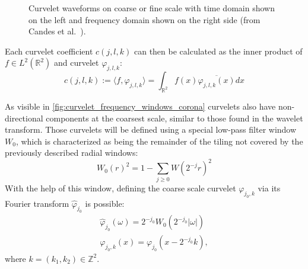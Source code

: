 \begin{figure}[h]
    \centering
    \quad
    \caption[Curvelet waveforms in time and frequency domain]{
        Curvelet waveforms on coarse  or fine
         scale with time domain shown on the
        left and frequency domain shown on the right side (from Candes et al.\
        \autocite{candes_fast_2006}).
    }
    \label{fig:curvelet_examples}
\end{figure}


Each curvelet coefficient $c(j, l, k)$ can then be calculated as the inner
product of $f \in L^2(\mathbb{R}^2)$ and curvelet $\varphi_{j, l, k}$:
\begin{equation} \label{eq:continuous_curvelet_coefficient}
    c(j, l, k) := \langle f, \varphi_{j, l, k} \rangle = \int_{\mathbb{R}^2} f(x) \overline{\varphi_{j, l, k}(x)} dx
\end{equation}

As visible in \autoref{fig:curvelet_frequency_windows_corona} curvelets also
have non-directional components at the coarsest scale, similar to those found
in the wavelet transform. Those curvelets will be defined using a special
low-pass filter window $W_0$, which is characterized as being the remainder of
the tiling not covered by the previously described radial windows:
\begin{equation*}
    W_0(r)^2 = 1 - \sum_{j \geq 0} W(2^{-j}r)^2
\end{equation*}
With the help of this window, defining the coarse scale curvelet $\varphi_{j_0,
k}$ via its Fourier transform $\hat{\varphi}_{j_0}$ is possible:
\begin{gather*} \label{eq:continuous_coarse_curvelet}
    \hat{\varphi}_{j_0}(\omega) = 2^{-j_0}W_0(2^{-j_0}|\omega|)\\
    \varphi_{j_0, k}(x) = \varphi_{j_0}(x-2^{-j_0}k),
\end{gather*}
where $k = (k_1, k_2) \in \mathbb{Z}^2$.


